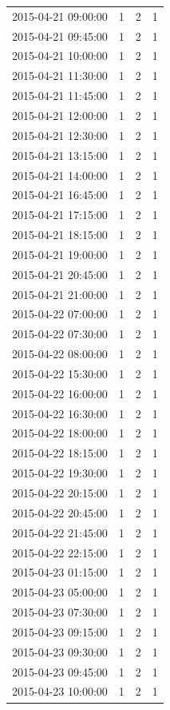 \begin{tabular}{lrrr}
2015-04-21 09:00:00 & 1 & 2 & 1 \\
2015-04-21 09:45:00 & 1 & 2 & 1 \\
2015-04-21 10:00:00 & 1 & 2 & 1 \\
2015-04-21 11:30:00 & 1 & 2 & 1 \\
2015-04-21 11:45:00 & 1 & 2 & 1 \\
2015-04-21 12:00:00 & 1 & 2 & 1 \\
2015-04-21 12:30:00 & 1 & 2 & 1 \\
2015-04-21 13:15:00 & 1 & 2 & 1 \\
2015-04-21 14:00:00 & 1 & 2 & 1 \\
2015-04-21 16:45:00 & 1 & 2 & 1 \\
2015-04-21 17:15:00 & 1 & 2 & 1 \\
2015-04-21 18:15:00 & 1 & 2 & 1 \\
2015-04-21 19:00:00 & 1 & 2 & 1 \\
2015-04-21 20:45:00 & 1 & 2 & 1 \\
2015-04-21 21:00:00 & 1 & 2 & 1 \\
2015-04-22 07:00:00 & 1 & 2 & 1 \\
2015-04-22 07:30:00 & 1 & 2 & 1 \\
2015-04-22 08:00:00 & 1 & 2 & 1 \\
2015-04-22 15:30:00 & 1 & 2 & 1 \\
2015-04-22 16:00:00 & 1 & 2 & 1 \\
2015-04-22 16:30:00 & 1 & 2 & 1 \\
2015-04-22 18:00:00 & 1 & 2 & 1 \\
2015-04-22 18:15:00 & 1 & 2 & 1 \\
2015-04-22 19:30:00 & 1 & 2 & 1 \\
2015-04-22 20:15:00 & 1 & 2 & 1 \\
2015-04-22 20:45:00 & 1 & 2 & 1 \\
2015-04-22 21:45:00 & 1 & 2 & 1 \\
2015-04-22 22:15:00 & 1 & 2 & 1 \\
2015-04-23 01:15:00 & 1 & 2 & 1 \\
2015-04-23 05:00:00 & 1 & 2 & 1 \\
2015-04-23 07:30:00 & 1 & 2 & 1 \\
2015-04-23 09:15:00 & 1 & 2 & 1 \\
2015-04-23 09:30:00 & 1 & 2 & 1 \\
2015-04-23 09:45:00 & 1 & 2 & 1 \\
2015-04-23 10:00:00 & 1 & 2 & 1 \\

\end{tabular}
